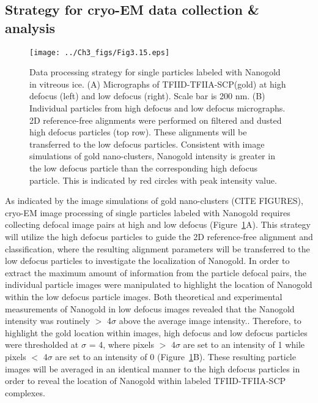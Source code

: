 \subsection{Strategy for cryo-EM data collection \& analysis}
\begin{figure}
\centering
\texttt{[image: ../Ch3\_figs/Fig3.15.eps]}
\caption[Data processing strategy for single particles labeled with Nanogold in vitreous ice]{Data processing strategy for single particles labeled with Nanogold in vitreous ice. (A) Micrographs of TFIID-TFIIA-SCP(gold) at high defocus (left) and low defocus (right). Scale bar is 200 nm. (B) Individual particles from high defocus and low defocus micrographs. 2D reference-free alignments were performed on filtered and dusted high defocus particles (top row).  These alignments will be transferred to the low defocus particles. Consistent with image simulations of gold nano-clusters, Nanogold intensity is greater in the low defocus particle than the corresponding high defocus particle.  This is indicated by red circles with peak intensity value.}
\label{fig:Fig3.15}
\end{figure}
As indicated by the image simulations of gold nano-clusters (CITE FIGURES), cryo-EM image processing of single particles labeled with Nanogold requires collecting defocal image pairs at high and low defocus (Figure~\ref{fig:Fig3.15}A). This strategy will utilize the high defocus particles to guide the 2D reference-free alignment and classification, where the resulting alignment parameters will be transferred to the low defocus particles to investigate the localization of Nanogold. In order to extract the maximum amount of information from the particle defocal pairs, the individual particle images were manipulated to highlight the location of Nanogold within the low defocus particle images. Both theoretical and experimental measurements of Nanogold in low defocus images revealed that the Nanogold intensity was routinely $>$ 4$\sigma$ above the average image intensity.. Therefore, to highlight the gold location within images, high defocus and low defocus particles were thresholded at $\sigma$ = 4, where pixels $>$ 4$\sigma$ are set to an intensity of 1 while pixels $<$ 4$\sigma$ are set to an intensity of 0 (Figure~\ref{fig:Fig3.15}B). These resulting particle images will be averaged in an identical manner to the high defocus particles in order to reveal the location of Nanogold within labeled TFIID-TFIIA-SCP complexes.   \\

